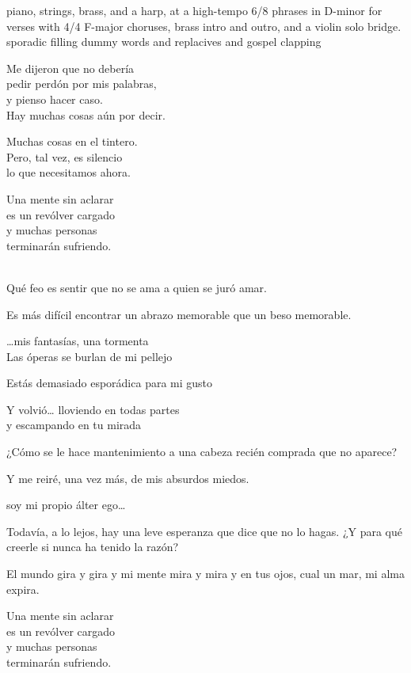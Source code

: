 
\begin{notes}
\end{notes}
\begin{style}
piano, strings, brass, and a harp, at a high-tempo 6/8 phrases in D-minor for verses with 4/4 F-major choruses, brass intro and outro, and a violin solo bridge. sporadic filling dummy words and replacives and gospel clapping
\end{style}
\begin{lyrics}
Me dijeron que no debería\\
pedir perdón por mis palabras,\\
y pienso hacer caso.\\
Hay muchas cosas aún por decir.

Muchas cosas en el tintero.\\ 
Pero, tal vez, es silencio\\
lo que necesitamos ahora.

Una mente sin aclarar\\
es un revólver cargado\\
y muchas personas\\
terminarán sufriendo.

\\
Qué feo es sentir que no se ama a quien se juró amar.

Es más difícil encontrar un abrazo memorable que un beso memorable.

…mis fantasías, una tormenta\\
Las óperas se burlan de mi pellejo 

Estás demasiado esporádica para mi gusto

Y volvió… lloviendo en todas partes\\
y escampando en tu mirada

¿Cómo se le hace mantenimiento a una cabeza recién comprada que no aparece?

Y me reiré, una vez más, de mis absurdos miedos.

soy mi propio álter ego…

Todavía, a lo lejos, hay una leve esperanza que dice que no lo hagas. ¿Y para qué creerle si nunca ha tenido la razón?

El mundo gira y gira y mi mente mira y mira y en tus ojos, cual un mar, mi alma expira.

Una mente sin aclarar\\
es un revólver cargado\\
y muchas personas\\
terminarán sufriendo.
\end{lyrics}

